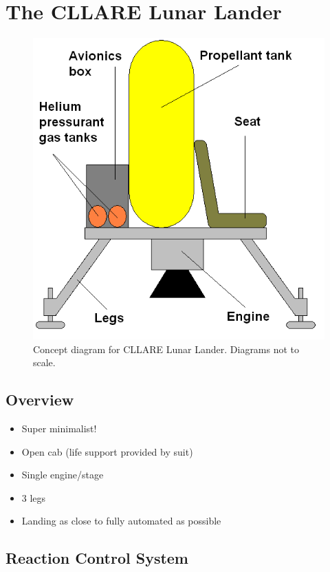 \documentclass{report}
\begin{document}
\section{The CLLARE Lunar Lander}

\begin{figure}[h] \label{fig:ll}
\centering
\includegraphics[scale=0.6]{images/cllare_ll_concept_labelled}
\caption{Concept diagram for CLLARE Lunar Lander.  Diagrams not to scale.}
\end{figure}

\subsection{Overview}

\begin{itemize}
\item Super minimalist!
\item Open cab (life support provided by suit)
\item Single engine/stage
\item 3 legs
\item Landing as close to fully automated as possible
\end{itemize}

\subsection{Reaction Control System}
\end{document}
